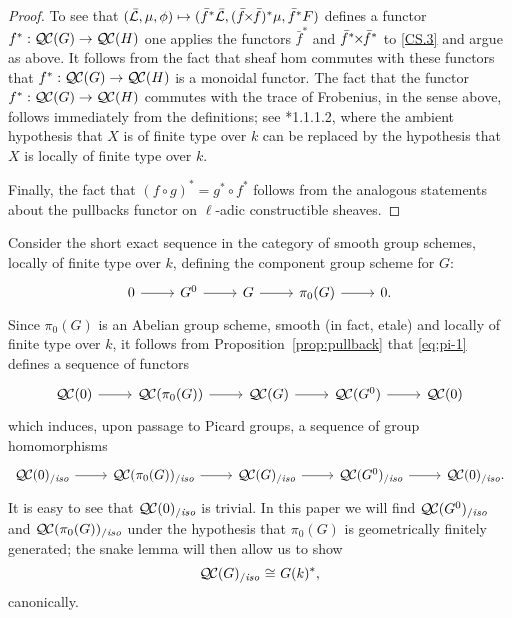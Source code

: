 \documentclass[11pt]{amsart}
\theoremstyle{plain}
\theoremstyle{definition}
\theoremstyle{remark}
\newcommand{\EE}{\mathbb{\bar Q}_\ell}
\newcommand{\Fq}{k}
\DeclareMathOperator{\Hom}{Hom}
\newcommand{\iso}{{\ \cong\ }}
\newcommand{\gcs}[1]{{\mathcal{\bar #1}}}
\newcommand{\QC}{{\mathcal{Q\hskip-0.8pt C}}}
\newcommand{\QCiso}[1]{\QC(#1)_{/\textit{iso}}}
\renewcommand{\bf}{\bar{f}}
\newcommand{\tight}[3]{\hspace{-#1pt}{#2}\hspace{-#3pt}}
\newcommand{\bfxf}{\text{$\bar{f} \tight{1}{\times}{1} \bar{f}$}}
\newcommand\David[1]{\marginpar{\smaller\smaller DR: #1}}
\begin{document}
\begin{proof}
  To see that $(\gcs{L},\mu,\phi) \mapsto (\bf^*\gcs{L},(\bfxf)^*\mu,\bf^*F)$
  defines a functor $f^* : \QC(G) \to \QC(H)$ one applies the functors $\bf^*$ and
  $\bf^*\tight{1}{\times}{1}\bf^*$ to \ref{CS.3} and argue as
  above. It follows from the fact that sheaf hom commutes with these
  functors that $f^* : \QC(G) \to \QC(H)$ is a monoidal functor.
%
  The fact that the functor $f^* : \QC(G) \to \QC(H)$ commutes with
  the trace of Frobenius, in the sense above, follows immediately from
  the definitions; see \cite{Laumon}*{1.1.1.2}, where the ambient
  hypothesis that $X$ is of finite type over $\Fq$ can be replaced by
  the hypothesis that $X$ is locally of finite type over $\Fq$.
  
  Finally, the fact that $(f\circ g)^* = g^* \circ f^*$ follows from the analogous
  statements about the pullbacks functor on $\ell$-adic constructible sheaves.
\end{proof}

Consider the short exact sequence in the category of smooth group
schemes, locally of finite type over $\Fq$, defining the component
group scheme for $G$:
\begin{equation}\label{eq:pi-2}
\begin{tikzcd}
0 \rar & G^0 \rar & G \rar & \pi_0(G) \rar & 0.
\end{tikzcd}
\end{equation}
Since $\pi_0(G)$ is an Abelian group scheme, smooth (in fact, etale) and locally of finite type over $\Fq$, 
it follows from Proposition~\ref{prop:pullback} that \eqref{eq:pi-1} defines a sequence of functors
\[
\begin{tikzcd}
\QC(0) \rar & \QC(\pi_0(G)) \rar & \QC(G) \rar & \QC(G^0) \rar & \QC(0)
\end{tikzcd}
\]
which induces, upon passage to Picard groups, a sequence of group homomorphisms 
\begin{equation}\label{eq:pi-1}
\begin{tikzcd}
\QCiso{0} \rar & \QCiso{\pi_0(G)} \rar & \QCiso{G} \rar & \QCiso{G^0} \rar & \QCiso{0}.
\end{tikzcd}
\end{equation}
It is easy to see that $\QCiso{0}$ is trivial. In this paper we will find $\QCiso{G^0}$ and $\QCiso{\pi_0(G)}$ under the hypothesis that $\pi_0(G)$ is geometrically finitely generated; 
the snake lemma will then allow us to show
\[
\QCiso{G} \iso G(\Fq)^*,%
\]
canonically.
\end{document}
